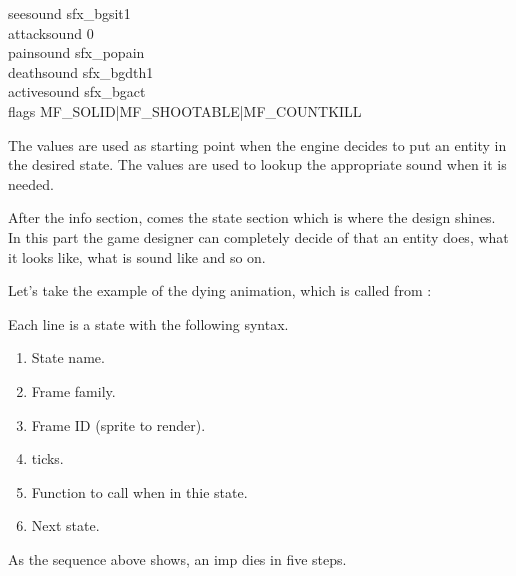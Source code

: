 seesound        sfx\_bgsit1\\
attacksound        0\\
painsound        sfx\_popain\\
deathsound        sfx\_bgdth1\\
activesound        sfx\_bgact\\

flags            MF\_SOLID|MF\_SHOOTABLE|MF\_COUNTKILL\\
\par
The  values are used as starting point when the engine decides to put an entity in the desired state. The  values are used to lookup the appropriate sound when it is needed.\\
\par
After the info section, comes the state section which is where the design shines. In this part the game designer can completely decide of that an entity does, what it looks like, what is sound like and so on.\\
\par
Let's take the example of the dying animation, which is called from :\\
\par
{}
\par
Each line is a state with the following syntax. 
\begin{enumerate}
\item State name.
\item Frame family.
\item Frame ID (sprite to render).
\item ticks.
\item Function to call when in thie state.
\item Next state.
\end{enumerate}
\par
As the sequence above shows, an imp dies in five steps.

